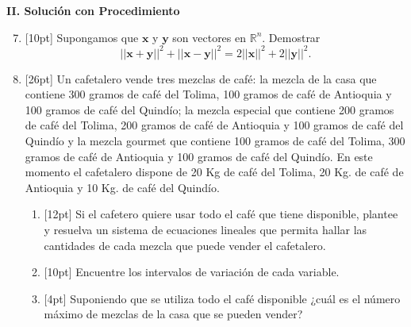 \documentclass[11pt]{article}
\begin{document}
\vspace{6pt}
\begin{center}\textbf{II. Solución con Procedimiento}\end{center}

\begin{enumerate}
\setcounter{enumi}{6}
\item{}[10pt] Supongamos que $\mathbf{x}$ y $\mathbf{y}$ son vectores en $\mathbb{R}^n$. Demostrar
\[
||\mathbf{x}+\mathbf{y}||^2 + ||\mathbf{x}-\mathbf{y}||^2 = 2||\mathbf{x}||^2 + 2||\mathbf{y}||^2.
\]

\vspace{6cm}

\item{}[26pt] Un cafetalero vende tres mezclas de café: la mezcla de la casa que contiene 300 gramos de café del Tolima, 100 gramos de café de Antioquia y 100 gramos de café del Quindío; la mezcla especial que contiene 200 gramos de café del Tolima, 200 gramos de café de Antioquia y 100 gramos de café del Quindío y la mezcla gourmet que contiene 100 gramos de café del Tolima, 300 gramos de café de Antioquia y 100 gramos de café del Quindío. En este momento el cafetalero dispone de 20 Kg de café del Tolima, 20 Kg. de café de Antioquia y 10 Kg. de café del Quindío.
\begin{enumerate}
\item{}[12pt] Si el cafetero quiere usar todo el café que tiene disponible, plantee y resuelva un sistema de ecuaciones lineales que permita hallar las cantidades de cada mezcla que puede vender el cafetalero.

\vspace{6cm}

\item{}[10pt] Encuentre los intervalos de variación de cada variable.

\vspace{6cm}

\item{}[4pt] Suponiendo que se utiliza todo el café disponible ¿cuál es el número máximo de mezclas de la casa que se pueden vender?

\vspace{3cm}
\end{enumerate}


\end{enumerate}
\end{document}
